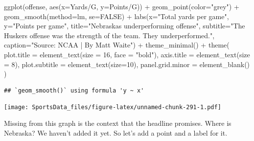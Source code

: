 \documentclass[
]{book}
\newenvironment{Shaded}{\begin{snugshade}}{\end{snugshade}}
\newcommand{\AttributeTok}[1]{\textcolor[rgb]{0.77,0.63,0.00}{#1}}
\newcommand{\ConstantTok}[1]{\textcolor[rgb]{0.00,0.00,0.00}{#1}}
\newcommand{\DecValTok}[1]{\textcolor[rgb]{0.00,0.00,0.81}{#1}}
\newcommand{\FunctionTok}[1]{\textcolor[rgb]{0.00,0.00,0.00}{#1}}
\newcommand{\NormalTok}[1]{#1}
\newcommand{\SpecialCharTok}[1]{\textcolor[rgb]{0.00,0.00,0.00}{#1}}
\newcommand{\StringTok}[1]{\textcolor[rgb]{0.31,0.60,0.02}{#1}}
\begin{document}
\begin{Shaded}
\begin{Highlighting}[]
\FunctionTok{ggplot}\NormalTok{(offense, }\FunctionTok{aes}\NormalTok{(}\AttributeTok{x=}\StringTok{\textasciigrave{}}\AttributeTok{Yards/G}\StringTok{\textasciigrave{}}\NormalTok{, }\AttributeTok{y=}\StringTok{\textasciigrave{}}\AttributeTok{Points/G}\StringTok{\textasciigrave{}}\NormalTok{)) }\SpecialCharTok{+} 
  \FunctionTok{geom\_point}\NormalTok{(}\AttributeTok{color=}\StringTok{"grey"}\NormalTok{) }\SpecialCharTok{+} \FunctionTok{geom\_smooth}\NormalTok{(}\AttributeTok{method=}\NormalTok{lm, }\AttributeTok{se=}\ConstantTok{FALSE}\NormalTok{) }\SpecialCharTok{+} 
  \FunctionTok{labs}\NormalTok{(}\AttributeTok{x=}\StringTok{"Total yards per game"}\NormalTok{, }\AttributeTok{y=}\StringTok{"Points per game"}\NormalTok{, }\AttributeTok{title=}\StringTok{"Nebraska\textquotesingle{}s underperforming offense"}\NormalTok{, }\AttributeTok{subtitle=}\StringTok{"The Husker\textquotesingle{}s offense was the strength of the team. They underperformed."}\NormalTok{, }\AttributeTok{caption=}\StringTok{"Source: NCAA | By Matt Waite"}\NormalTok{) }\SpecialCharTok{+} 
  \FunctionTok{theme\_minimal}\NormalTok{() }\SpecialCharTok{+} 
  \FunctionTok{theme}\NormalTok{(}
    \AttributeTok{plot.title =} \FunctionTok{element\_text}\NormalTok{(}\AttributeTok{size =} \DecValTok{16}\NormalTok{, }\AttributeTok{face =} \StringTok{"bold"}\NormalTok{),}
    \AttributeTok{axis.title =} \FunctionTok{element\_text}\NormalTok{(}\AttributeTok{size =} \DecValTok{8}\NormalTok{), }
    \AttributeTok{plot.subtitle =} \FunctionTok{element\_text}\NormalTok{(}\AttributeTok{size=}\DecValTok{10}\NormalTok{), }
    \AttributeTok{panel.grid.minor =} \FunctionTok{element\_blank}\NormalTok{()}
\NormalTok{    ) }
\end{Highlighting}
\end{Shaded}

\begin{verbatim}
## `geom_smooth()` using formula 'y ~ x'
\end{verbatim}

\texttt{[image: SportsData\_files/figure-latex/unnamed-chunk-291-1.pdf]}

Missing from this graph is the context that the headline promises. Where is Nebraska? We haven't added it yet. So let's add a point and a label for it.
\end{document}
